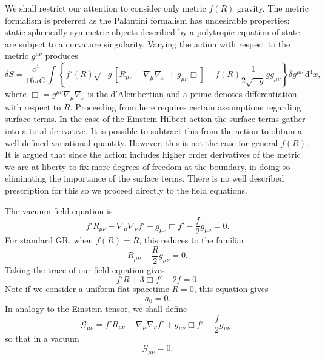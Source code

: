 \documentclass[a4paper, 11pt, titlepage, twoside]{report}
\newcommand{\dd}{\ensuremath{\mathrm{d}}}
\newcommand{\intd}[4]{\ensuremath{\int_{#1}^{#2}{#3}\,\dd{#4}}}
\begin{document}
We shall restrict our attention to consider only metric $f(R)$ gravity. The metric formalism is preferred as the Palantini formalism has undesirable properties: static spherically symmetric objects described by a polytropic equation of state are subject to a curvature singularity\cite{Barausse2008b, Barausse2008a}. Varying the action with respect to the metric $g^{\mu\nu}$ produces
\begin{equation}
\delta S = \frac{c^4}{16\pi G}\intd{}{}{\left\{f'(R)\sqrt{-g}\left[R_{\mu\nu} - \nabla_\mu\nabla_\nu\ + g_{\mu\nu}\Box\right] - f(R)\frac{1}{2\sqrt{-g}}gg_{\mu\nu}\right\}\delta g^{\mu\nu}}{^4x},
\end{equation}
where $\Box = g^{\mu\nu}\nabla_\mu\nabla_\nu$ is the d'Alembertian and a prime denotes differentiation with respect to $R$. Proceeding from here requires certain assumptions regarding surface terms. In the case of the Einstein-Hilbert action the surface terms gather into a total derivative. It is possible to subtract this from the action to obtain a well-defined variational quantity\cite{York1972, Gibbons1977}. However, this is not the case for general $f(R)$\cite{Madsen1989}. It is argued that since the action includes higher order derivatives of the metric we are at liberty to fix more degrees of freedom at the boundary, in doing so eliminating the importance of the surface terms\cite{Sotiriou2010}. There is no well described prescription for this so we proceed directly to the field equations.

The vacuum field equation is
\begin{equation}
f'R_{\mu\nu} - \nabla_\mu\nabla_\nu f' + g_{\mu\nu}\Box f' - \frac{f}{2}g_{\mu\nu} = 0.
\label{eq:Field_eq}
\end{equation}
For standard GR, when $f(R) = R$, this reduces to the familiar
\begin{equation}
R_{\mu\nu} - \frac{R}{2}g_{\mu\nu} = 0.
\end{equation}
Taking the trace of our field equation gives
\begin{equation}
f'R + 3\Box f' - 2f = 0.
\label{eq:Trace_eq}
\end{equation}
Note if we consider a uniform flat spacetime $R = 0$, this equation gives
\begin{equation}
a_0 = 0.
\label{eq:a_0}
\end{equation}
In analogy to the Einstein tensor, we shall define
\begin{equation}
\mathcal{G}_{\mu\nu} = f'R_{\mu\nu} - \nabla_\mu\nabla_\nu f' + g_{\mu\nu}\Box f' - \frac{f}{2}g_{\mu\nu},
\label{eq:G_tensor}
\end{equation}
so that in a vacuum
\begin{equation}
\mathcal{G}_{\mu\nu} = 0.
\end{equation}
\end{document}
